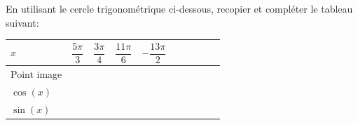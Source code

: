 \documentclass[a4paper,12pt]{article}        %
\begin{document}
\setcounter{exo}{1}

En utilisant le cercle trigonométrique ci-dessous, recopier et compléter le tableau suivant:\\
\begin{center}
\begin{tabular}{ | Xc | Xc | Xc | Xc | Xc |}
    \hline
    $x$  & $\dfrac{5\pi}{3}$ & $\dfrac{3\pi}{4}$ & $\dfrac{11\pi}{6}$ &  $-\dfrac{13\pi}{2}$ \\ \hline
    Point image  &   &   &   &   \\ \hline
    $\cos(x)$  &   &   &   &   \\ \hline
    $\sin(x)$ &   &   &   &   \\
    \hline  
\end{tabular}
\end{center}
\end{document}
